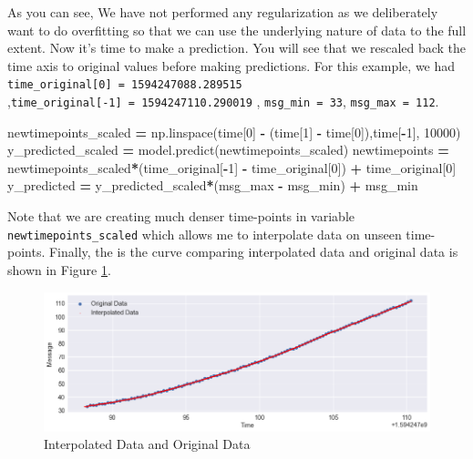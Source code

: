 \documentclass[onecolumn]{article}
\newenvironment{Shaded}{\begin{snugshade}}{\end{snugshade}}
\newcommand{\DecValTok}[1]{\textcolor[rgb]{0.00,0.00,0.81}{#1}}
\newcommand{\OperatorTok}[1]{\textcolor[rgb]{0.81,0.36,0.00}{\textbf{#1}}}
\newcommand{\NormalTok}[1]{#1}
\begin{document}
As you can see, We have not performed any regularization as we
deliberately want to do overfitting so that we can use the underlying
nature of data to the full extent. Now it's time to make a prediction.
You will see that we rescaled back the time axis to original values
before making predictions. For this example, we had
\texttt{time\_original{[}0{]}\ =\ 1594247088.289515}
,\texttt{time\_original{[}-1{]}\ =\ 1594247110.290019} ,
\texttt{msg\_min\ =\ 33}, \texttt{msg\_max\ =\ 112}.

\begin{Shaded}
\begin{Highlighting}[]
\NormalTok{newtimepoints_scaled }\OperatorTok{=}\NormalTok{ np.linspace(time[}\DecValTok{0}\NormalTok{] }\OperatorTok{-}\NormalTok{ (time[}\DecValTok{1}\NormalTok{] }\OperatorTok{-}\NormalTok{ time[}\DecValTok{0}\NormalTok{]),time[}\OperatorTok{-}\DecValTok{1}\NormalTok{], }\DecValTok{10000}\NormalTok{)}
\NormalTok{y_predicted_scaled }\OperatorTok{=}\NormalTok{ model.predict(newtimepoints_scaled)}
\NormalTok{newtimepoints }\OperatorTok{=} 
\NormalTok{    newtimepoints_scaled}\OperatorTok{*}\NormalTok{(time_original[}\OperatorTok{-}\DecValTok{1}\NormalTok{] }\OperatorTok{-}\NormalTok{ time_original[}\DecValTok{0}\NormalTok{]) }\OperatorTok{+}\NormalTok{ time_original[}\DecValTok{0}\NormalTok{]}
\NormalTok{y_predicted }\OperatorTok{=}\NormalTok{ y_predicted_scaled}\OperatorTok{*}\NormalTok{(msg_max }\OperatorTok{-}\NormalTok{ msg_min) }\OperatorTok{+}\NormalTok{ msg_min}
\end{Highlighting}
\end{Shaded}

Note that we are creating much denser time-points in variable
\texttt{newtimepoints\_scaled} which allows me to interpolate data on
unseen time-points. Finally, the is the curve comparing interpolated
data and original data is shown in Figure \ref{interpolated}.

\begin{figure}
\centering
\includegraphics[width=1.00000\textwidth]{autoencoder_tf2_interpolation.png}
\caption{Interpolated Data and Original Data\label{interpolated}}
\end{figure}
\end{document}
